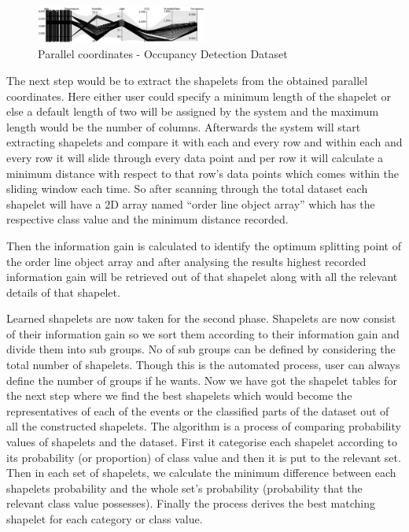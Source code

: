 \documentclass[letterpaper, 10 pt, conference]{IEEEtran}  %
\begin{document}
\begin{figure}[h!]
\includegraphics[width=0.5\textwidth]{occupancy_d3.png}
\caption{Parallel coordinates - Occupancy Detection Dataset}
\end{figure}

The next step would be to extract the shapelets from the obtained parallel coordinates. Here either user could specify a minimum length of the shapelet or else a default length of two will be assigned by the system and the maximum length would be the number of columns. Afterwards the system will start extracting shapelets and compare it with each and every row and within each and every row it will slide through every data point and per row it will calculate a minimum distance with respect to that row’s data points which comes within the sliding window each time. So after scanning through the total dataset each shapelet will have a 2D array named “order line object array” which has the respective class value and the minimum distance recorded.

Then the information gain is calculated to identify the optimum splitting point of the order line object array and after analysing the results highest recorded information gain will be retrieved out of that shapelet along with all the relevant details of that shapelet. 

Learned shapelets are now taken for the second phase. Shapelets are now consist of their information gain so we sort them according to their information gain and divide them into sub groups. No of sub groups can be defined by considering the total number of shapelets. Though this is the automated process, user can always define the number of groups if he wants. Now we have got the shapelet tables for the next step where we find the best shapelets which would become the representatives of each of the events or the classified parts of the dataset out of all the constructed shapelets. The algorithm is a process of comparing probability values of shapelets and the dataset. First it categorise each shapelet according to its probability (or proportion) of class value and then it is put to the relevant set. Then in each set of shapelets, we calculate the minimum difference between each shapelets probability and the whole set’s probability (probability that the relevant class value possesses). Finally the process derives the best matching shapelet for each category or class value.
\end{document}
